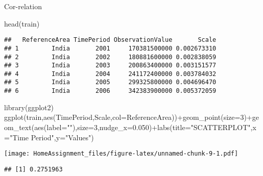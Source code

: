 \documentclass[
]{article}
\newenvironment{Shaded}{\begin{snugshade}}{\end{snugshade}}
\newcommand{\AttributeTok}[1]{\textcolor[rgb]{0.77,0.63,0.00}{#1}}
\newcommand{\CommentTok}[1]{\textcolor[rgb]{0.56,0.35,0.01}{\textit{#1}}}
\newcommand{\DecValTok}[1]{\textcolor[rgb]{0.00,0.00,0.81}{#1}}
\newcommand{\FloatTok}[1]{\textcolor[rgb]{0.00,0.00,0.81}{#1}}
\newcommand{\FunctionTok}[1]{\textcolor[rgb]{0.00,0.00,0.00}{#1}}
\newcommand{\NormalTok}[1]{#1}
\newcommand{\SpecialCharTok}[1]{\textcolor[rgb]{0.00,0.00,0.00}{#1}}
\newcommand{\StringTok}[1]{\textcolor[rgb]{0.31,0.60,0.02}{#1}}
\begin{document}
Cor-relation

\begin{Shaded}
\begin{Highlighting}[]
\FunctionTok{head}\NormalTok{(train)}
\end{Highlighting}
\end{Shaded}

\begin{verbatim}
##   ReferenceArea TimePeriod ObservationValue       Scale
## 1         India       2001     170381500000 0.002673310
## 2         India       2002     180881600000 0.002838059
## 3         India       2003     200863400000 0.003151577
## 4         India       2004     241172400000 0.003784032
## 5         India       2005     299325800000 0.004696470
## 6         India       2006     342383900000 0.005372059
\end{verbatim}

\begin{Shaded}
\begin{Highlighting}[]
\FunctionTok{library}\NormalTok{(ggplot2)}
\FunctionTok{ggplot}\NormalTok{(train,}\FunctionTok{aes}\NormalTok{(TimePeriod,Scale,}\AttributeTok{col=}\NormalTok{ReferenceArea))}\SpecialCharTok{+}\FunctionTok{geom\_point}\NormalTok{(}\AttributeTok{size=}\DecValTok{3}\NormalTok{)}\SpecialCharTok{+}\FunctionTok{geom\_text}\NormalTok{(}\FunctionTok{aes}\NormalTok{(}\AttributeTok{label=}\StringTok{""}\NormalTok{),}\AttributeTok{size=}\DecValTok{3}\NormalTok{,}\AttributeTok{nudge\_x=}\FloatTok{0.050}\NormalTok{)}\SpecialCharTok{+}\FunctionTok{labs}\NormalTok{(}\AttributeTok{title=}\StringTok{"SCATTERPLOT"}\NormalTok{,}\AttributeTok{x=}\StringTok{"Time Period"}\NormalTok{,}\AttributeTok{y=}\StringTok{"Values"}\NormalTok{)}
\end{Highlighting}
\end{Shaded}

\texttt{[image: HomeAssignment\_files/figure-latex/unnamed-chunk-9-1.pdf]}

\begin{Shaded}
\end{Shaded}

\begin{verbatim}
## [1] 0.2751963
\end{verbatim}

\begin{Shaded}
\end{Shaded}
\end{document}
